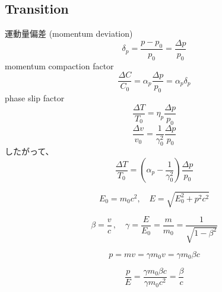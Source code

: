 \documentclass[10pt,a4paper]{ltjsarticle}
\begin{document}
\subsection{Transition}
運動量偏差 (momentum deviation)
\begin{equation}
    \delta_p = \frac{p-p_0}{p_0}=\frac{\Delta p}{p_0}
\end{equation}
%
momentum compaction factor
%
\begin{equation}
    \frac{\Delta C}{C_0}=\alpha_p\frac{\Delta p}{p_0}=\alpha_p\delta_p
\end{equation}
%
phase slip factor
\begin{equation}
    \frac{\Delta T}{T_0}=\eta_p\frac{\Delta p}{p_0}
\end{equation}
%
\begin{equation}
    \frac{\Delta v}{v_0}=\frac{1}{\gamma_0^2}\frac{\Delta p}{p_0}
    \label{delta_v}
\end{equation}
%
したがって、
%
\begin{equation}
    \frac{\Delta T}{T_0} = \left(\alpha_p - \frac{1}{\gamma_0^2}\right)\frac{\Delta p}{p_0}
\end{equation}
%
\begin{tcolorbox}[title=相対論のおさらい]
    \begin{equation}
        E_0 = m_0 c^2 ,\quad E = \sqrt{E_0^2 + p^2 c^2} \tag{A.1}
    \end{equation}

    \begin{equation}
        \beta = \frac{v}{c}\,,\quad \gamma = \frac{E}{E_0}=\frac{m}{m_0}=\frac{1}{\sqrt{1-\beta^2}} \tag{A.2}
    \end{equation}

    \begin{equation}
        p = mv = \gamma m_0 v = \gamma m_0 \beta c \tag{A.3}
    \end{equation}

    \begin{equation}
        \frac{p}{E} = \frac{\gamma m_0 \beta c}{\gamma m_0 c^2} = \frac{\beta}{c} \tag{A.4}
    \end{equation}
\end{tcolorbox}
\end{document}
